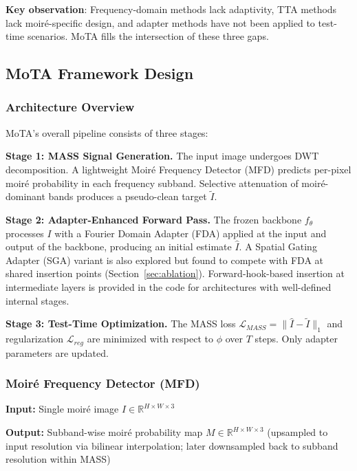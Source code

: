 \documentclass[10pt,twocolumn,letterpaper]{article}
\begin{document}
\textbf{Key observation}: Frequency-domain methods lack adaptivity, TTA methods lack moir\'{e}-specific design, and adapter methods have not been applied to test-time scenarios. MoTA fills the intersection of these three gaps.

\subsection{MoTA Framework Design}

\subsubsection{Architecture Overview}

MoTA's overall pipeline consists of three stages:

\textbf{Stage 1: MASS Signal Generation.} The input image undergoes DWT decomposition. A lightweight Moir\'{e} Frequency Detector (MFD) predicts per-pixel moir\'{e} probability in each frequency subband. Selective attenuation of moir\'{e}-dominant bands produces a pseudo-clean target $\tilde{I}$.

\textbf{Stage 2: Adapter-Enhanced Forward Pass.} The frozen backbone $f_\theta$ processes $I$ with a Fourier Domain Adapter (FDA) applied at the input and output of the backbone, producing an initial estimate $\hat{I}$. A Spatial Gating Adapter (SGA) variant is also explored but found to compete with FDA at shared insertion points (Section~\ref{sec:ablation}). Forward-hook-based insertion at intermediate layers is provided in the code for architectures with well-defined internal stages.

\textbf{Stage 3: Test-Time Optimization.} The MASS loss $\mathcal{L}_{MASS} = \|\hat{I} - \tilde{I}\|_1$ and regularization $\mathcal{L}_{reg}$ are minimized with respect to $\phi$ over $T$ steps. Only adapter parameters are updated.

\subsubsection{Moir\'{e} Frequency Detector (MFD)}

\textbf{Input:} Single moir\'{e} image $I \in \mathbb{R}^{H \times W \times 3}$

\textbf{Output:} Subband-wise moir\'{e} probability map $M \in \mathbb{R}^{H \times W \times 3}$ (upsampled to input resolution via bilinear interpolation; later downsampled back to subband resolution within MASS)
\end{document}
